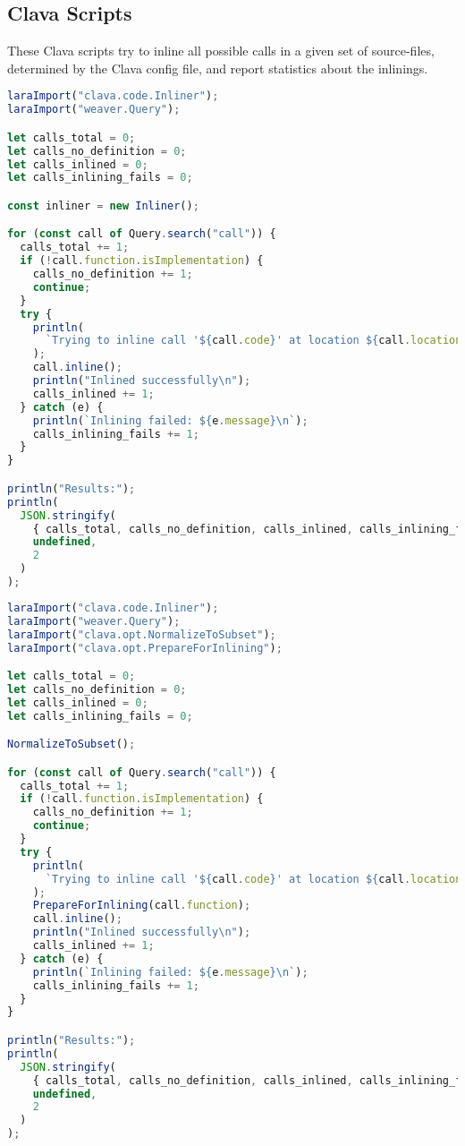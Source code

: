 \subsection{Clava Scripts}

These Clava scripts try to inline all possible calls in a given set of source-files, determined by the Clava config file, and report statistics about the inlinings.

\begin{lstlisting}[language=js,caption=Clava built-in inlining with no normalization]
laraImport("clava.code.Inliner");
laraImport("weaver.Query");

let calls_total = 0;
let calls_no_definition = 0;
let calls_inlined = 0;
let calls_inlining_fails = 0;

const inliner = new Inliner();

for (const call of Query.search("call")) {
  calls_total += 1;
  if (!call.function.isImplementation) {
    calls_no_definition += 1;
    continue;
  }
  try {
    println(
      `Trying to inline call '${call.code}' at location ${call.location}`
    );
    call.inline();
    println("Inlined successfully\n");
    calls_inlined += 1;
  } catch (e) {
    println(`Inlining failed: ${e.message}\n`);
    calls_inlining_fails += 1;
  }
}

println("Results:");
println(
  JSON.stringify(
    { calls_total, calls_no_definition, calls_inlined, calls_inlining_fails },
    undefined,
    2
  )
);
\end{lstlisting}

\begin{lstlisting}[language=js,caption=Clava built-in inlining with normalization]
laraImport("clava.code.Inliner");
laraImport("weaver.Query");
laraImport("clava.opt.NormalizeToSubset");
laraImport("clava.opt.PrepareForInlining");

let calls_total = 0;
let calls_no_definition = 0;
let calls_inlined = 0;
let calls_inlining_fails = 0;

NormalizeToSubset();

for (const call of Query.search("call")) {
  calls_total += 1;
  if (!call.function.isImplementation) {
    calls_no_definition += 1;
    continue;
  }
  try {
    println(
      `Trying to inline call '${call.code}' at location ${call.location}`
    );
    PrepareForInlining(call.function);
    call.inline();
    println("Inlined successfully\n");
    calls_inlined += 1;
  } catch (e) {
    println(`Inlining failed: ${e.message}\n`);
    calls_inlining_fails += 1;
  }
}

println("Results:");
println(
  JSON.stringify(
    { calls_total, calls_no_definition, calls_inlined, calls_inlining_fails },
    undefined,
    2
  )
);
\end{lstlisting}

